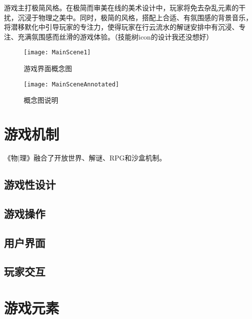 \documentclass{tstextbook}
\begin{document}
游戏主打极简风格。在极简而审美在线的美术设计中，玩家将免去杂乱元素的干扰，沉浸于物理之美中。同时，极简的风格，搭配上合适、有氛围感的背景音乐，将潜移默化中引导玩家的专注力，使得玩家在行云流水的解谜安排中有沉浸、专注、充满氛围感而丝滑的游戏体验。（技能树icon的设计我还没想好）

\begin{figure}[H]
\centering
\texttt{[image: MainScene1]} 
\caption{游戏界面概念图}
\label{MainScene}
\end{figure}

\begin{figure}[H]
\centering
\texttt{[image: MainSceneAnnotated]} 
\caption{概念图说明}
\label{MainScene}
\end{figure}

\chapter{游戏机制}

\begin{summary}
《物$|$理》融合了开放世界、解谜、RPG和沙盒机制。
\end{summary}

\section{游戏性设计}


\section{游戏操作}


\section{用户界面}



\section{玩家交互}


\chapter{游戏元素}

\begin{summary}

\end{summary}
\end{document}
